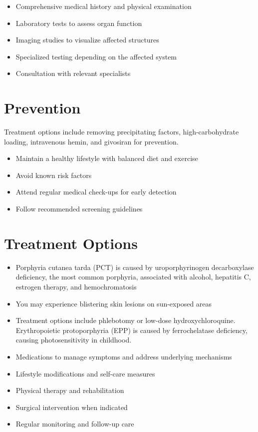 \begin{itemize}[noitemsep]
  \item Comprehensive medical history and physical examination
  \item Laboratory tests to assess organ function
  \item Imaging studies to visualize affected structures
  \item Specialized testing depending on the affected system
  \item Consultation with relevant specialists
\end{itemize}
\section{Prevention}
Treatment options include removing precipitating factors, high-carbohydrate loading, intravenous hemin, and givosiran for prevention.

\begin{itemize}[noitemsep]
  \item Maintain a healthy lifestyle with balanced diet and exercise
  \item Avoid known risk factors
  \item Attend regular medical check-ups for early detection
  \item Follow recommended screening guidelines
\end{itemize}
\section{Treatment Options}
\begin{itemize}[noitemsep]
  \item Porphyria cutanea tarda (PCT) is caused by uroporphyrinogen decarboxylase deficiency, the most common porphyria, associated with alcohol, hepatitis C, estrogen therapy, and hemochromatosis
  \item You may experience blistering skin lesions on sun-exposed areas
  \item Treatment options include phlebotomy or low-dose hydroxychloroquine. Erythropoietic protoporphyria (EPP) is caused by ferrochelatase deficiency, causing photosensitivity in childhood.
  \item Medications to manage symptoms and address underlying mechanisms
  \item Lifestyle modifications and self-care measures
  \item Physical therapy and rehabilitation
  \item Surgical intervention when indicated
  \item Regular monitoring and follow-up care
\end{itemize}
